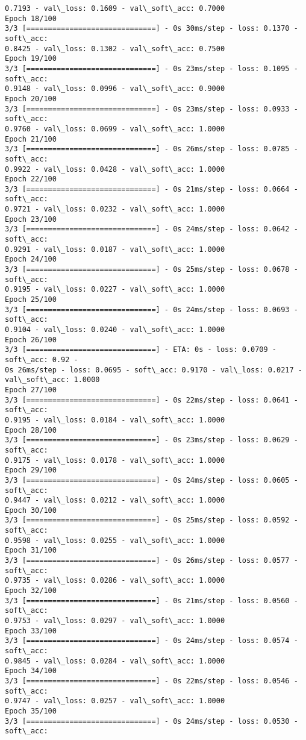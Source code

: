 \documentclass[11pt]{article}
\begin{document}
\begin{Verbatim}[commandchars=\\\{\}]
0.7193 - val\_loss: 0.1609 - val\_soft\_acc: 0.7000
Epoch 18/100
3/3 [==============================] - 0s 30ms/step - loss: 0.1370 - soft\_acc:
0.8425 - val\_loss: 0.1302 - val\_soft\_acc: 0.7500
Epoch 19/100
3/3 [==============================] - 0s 23ms/step - loss: 0.1095 - soft\_acc:
0.9148 - val\_loss: 0.0996 - val\_soft\_acc: 0.9000
Epoch 20/100
3/3 [==============================] - 0s 23ms/step - loss: 0.0933 - soft\_acc:
0.9760 - val\_loss: 0.0699 - val\_soft\_acc: 1.0000
Epoch 21/100
3/3 [==============================] - 0s 26ms/step - loss: 0.0785 - soft\_acc:
0.9922 - val\_loss: 0.0428 - val\_soft\_acc: 1.0000
Epoch 22/100
3/3 [==============================] - 0s 21ms/step - loss: 0.0664 - soft\_acc:
0.9721 - val\_loss: 0.0232 - val\_soft\_acc: 1.0000
Epoch 23/100
3/3 [==============================] - 0s 24ms/step - loss: 0.0642 - soft\_acc:
0.9291 - val\_loss: 0.0187 - val\_soft\_acc: 1.0000
Epoch 24/100
3/3 [==============================] - 0s 25ms/step - loss: 0.0678 - soft\_acc:
0.9195 - val\_loss: 0.0227 - val\_soft\_acc: 1.0000
Epoch 25/100
3/3 [==============================] - 0s 24ms/step - loss: 0.0693 - soft\_acc:
0.9104 - val\_loss: 0.0240 - val\_soft\_acc: 1.0000
Epoch 26/100
3/3 [==============================] - ETA: 0s - loss: 0.0709 - soft\_acc: 0.92 -
0s 26ms/step - loss: 0.0695 - soft\_acc: 0.9170 - val\_loss: 0.0217 -
val\_soft\_acc: 1.0000
Epoch 27/100
3/3 [==============================] - 0s 22ms/step - loss: 0.0641 - soft\_acc:
0.9195 - val\_loss: 0.0184 - val\_soft\_acc: 1.0000
Epoch 28/100
3/3 [==============================] - 0s 23ms/step - loss: 0.0629 - soft\_acc:
0.9175 - val\_loss: 0.0178 - val\_soft\_acc: 1.0000
Epoch 29/100
3/3 [==============================] - 0s 24ms/step - loss: 0.0605 - soft\_acc:
0.9447 - val\_loss: 0.0212 - val\_soft\_acc: 1.0000
Epoch 30/100
3/3 [==============================] - 0s 25ms/step - loss: 0.0592 - soft\_acc:
0.9598 - val\_loss: 0.0255 - val\_soft\_acc: 1.0000
Epoch 31/100
3/3 [==============================] - 0s 26ms/step - loss: 0.0577 - soft\_acc:
0.9735 - val\_loss: 0.0286 - val\_soft\_acc: 1.0000
Epoch 32/100
3/3 [==============================] - 0s 21ms/step - loss: 0.0560 - soft\_acc:
0.9753 - val\_loss: 0.0297 - val\_soft\_acc: 1.0000
Epoch 33/100
3/3 [==============================] - 0s 24ms/step - loss: 0.0574 - soft\_acc:
0.9845 - val\_loss: 0.0284 - val\_soft\_acc: 1.0000
Epoch 34/100
3/3 [==============================] - 0s 22ms/step - loss: 0.0546 - soft\_acc:
0.9747 - val\_loss: 0.0257 - val\_soft\_acc: 1.0000
Epoch 35/100
3/3 [==============================] - 0s 24ms/step - loss: 0.0530 - soft\_acc:

\end{Verbatim}
\end{document}
